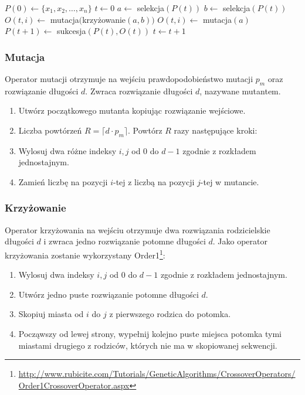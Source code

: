 \documentclass[12pt, a4paper]{article}
\begin{document}
\begin{algorithm}[!htb]
\label{ea}
\begin{algorithmic}[1]
  \State $P(0) \gets \{x_1, x_2, \ldots, x_n\}$
  \State $t \gets 0$
      \State $a \gets$ selekcja$(P(t))$
	\State $b \gets$ selekcja$(P(t))$
	\State $O(t,i) \gets$ mutacja$($krzy{\.z}owanie$(a, b))$
      \Else
	\State $O(t,i) \gets$ mutacja$(a)$
      \EndIf
    \EndFor
    \State $P(t+1) \gets$ sukcesja$(P(t),O(t))$
    \State $t \gets t+1$
  \EndWhile
\EndFunction
\end{algorithmic}
\end{algorithm}

\subsubsection{Mutacja}

Operator mutacji otrzymuje na wejściu prawdopodobieństwo mutacji $p_m$ oraz rozwiązanie długości $d$.
Zwraca rozwiązanie długości $d$, nazywane mutantem.

\begin{enumerate}
 \item Utwórz początkowego mutanta kopiując rozwiązanie wejściowe.
 \item Liczba powtórzeń $R = \lceil d \cdot  p_m \rceil$. Powtórz $R$ razy następujące kroki:
 \item Wylosuj dwa różne indeksy $i, j$ od 0 do $d-1$ zgodnie z rozkładem jednostajnym.
 \item Zamień liczbę na pozycji $i$-tej z liczbą na pozycji $j$-tej w mutancie.
\end{enumerate}

\subsubsection{Krzyżowanie}

Operator krzyżowania na wejściu otrzymuje dwa rozwiązania rodzicielskie długości $d$ i zwraca jedno rozwiązanie potomne długości $d$. 
Jako operator krzyżowania zostanie wykorzystany 
Order1\footnote{\url{http://www.rubicite.com/Tutorials/GeneticAlgorithms/CrossoverOperators/Order1CrossoverOperator.aspx}}:
\begin{enumerate}
 \item Wylosuj dwa indeksy $i, j$ od 0 do $d-1$ zgodnie z rozkładem jednostajnym.
 \item Utwórz jedno puste rozwiązanie potomne długości $d$.
 \item Skopiuj miasta od $i$ do $j$ z pierwszego rodzica do potomka.
 \item Począwszy od lewej strony, wypełnij kolejno puste miejsca potomka tymi miastami drugiego z rodziców, 
których nie ma w skopiowanej sekwencji.
\end{enumerate}
\end{document}
